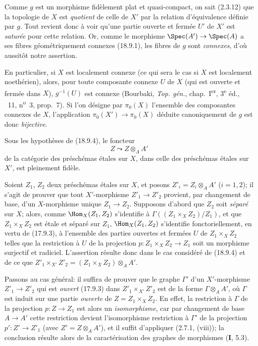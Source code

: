 Comme $g$ est un morphisme fidèlement plat et quasi-compact, on sait (2.3.12) que la topologie de $X$ est \emph{quotient} de celle de $X'$ par la relation d'équivalence définie par $g$. Tout revient donc à voir qu'une partie ouverte et fermée $U'$ de $X'$ est \emph{saturée} pour cette relation. Or, comme le morphisme $\Spec(A')\to\Spec(A)$ a ses fibres géométriquement connexes (18.9.1), les fibres de $g$ sont \emph{connexes}, d'où aussitôt notre assertion.

En particulier, si $X$ est localement connexe (ce qui sera le cas si $X$ est localement noethérien), alors, pour toute composante connexe $U$ de $X$ (qui est ouverte et fermée
dans $X$), $g^{-1}(U)$ est connexe (Bourbaki, \emph{Top. gén.}, chap.~I\textsuperscript{er}, 3\textsuperscript{e} éd., \textsection~11, n\textsuperscript{o}~3, prop.~7). Si l'on désigne par $\pi_0(X)$ l'ensemble des composantes connexes de $X$, l'application $\pi_0(X')\to\pi_0(X)$ déduite canoniquement de $g$ est donc \emph{bijective}.

\begin{corollary}[18.9.5]
\label{IV.18.9.5}
Sous les hypothèses de \textup{(18.9.4)}, le foncteur
\begin{equation}
  Z\leadsto Z\otimes_A A'
  \tag{18.9.5.1}
  \label{IV.18.9.5.1}
\end{equation}
de la catégorie des préschémas étales sur $X$, dans celle des préschémas étales sur $X'$, est pleinement fidèle.
\end{corollary}

Soient $Z_1$, $Z_2$ deux préschémas étales sur $X$, et posons $Z'_i=Z_i\otimes_A A'$ ($i=1,2$); il s'agit de prouver que tout $X'$-morphisme $Z'_1\to Z'_2$ provient, par changement de base, d'un $X$-morphisme unique $Z_1\to Z_2$. Supposons d'abord que $Z_2$ soit \emph{séparé} sur $X$; alors, comme $\Hom_X(Z_1,Z_2)$ s'identifie à $\Gamma((Z_1\times_X Z_2)/Z_1)$, et que $Z_1\times_X Z_2$ est étale et séparé sur $Z_1$, $\Hom_X(Z_1,Z_2)$ s'identifie fonctoriellement, en vertu de (17.9.3), à l'ensemble des parties ouvertes et fermées $U$ de $Z_1\times_X Z_2$ telles que la restriction à $U$ de la projection $p:Z_1\times_X Z_2\to Z_1$ soit un morphisme surjectif et radiciel. L'assertion résulte donc dans le cas considéré de (18.9.4) et de ce que $Z'_1\times_{X'}Z'_2=(Z_1\times_X Z_2)\otimes_A A'$.

Passons au cas général: il suffira de prouver que le graphe $\Gamma'$ d'un $X'$-morphisme $Z'_1\to Z'_2$ qui est \emph{ouvert} (17.9.3) dans $Z'_1\times_{X'}Z'_2$ est de la forme $\Gamma\otimes_A A'$, où $\Gamma$ est induit sur une partie \emph{ouverte} de $Z=Z_1\times_X Z_2$. En effet, la restriction à $\Gamma$ de la projection $p:Z\to Z_1$ est alors un \emph{isomorphisme}, car par changement de base $A\to A'$ cette restriction devient l'isomorphisme restriction à $\Gamma'$ de la projection $p':Z'\to Z'_1$ (avec $Z'=Z\otimes_A A'$), et il suffit d'appliquer (2.7.1, (viii)); la conclusion résulte alors de la caractérisation des graphes de morphismes (\textbf{I}, 5.3).

